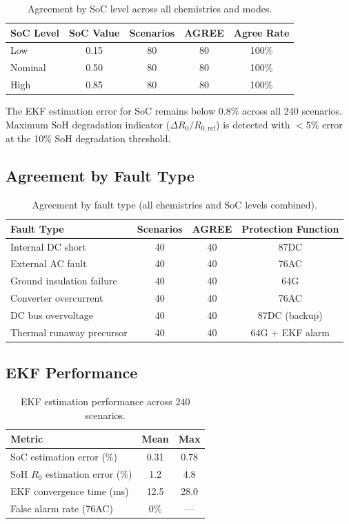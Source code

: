 \documentclass[11pt, a4paper]{article}
\begin{document}
\begin{table}[ht]
\centering
\caption{Agreement by SoC level across all chemistries and modes.}
\label{tab:soc_agree}
\begin{tabular}{lcccc}
\toprule
SoC Level & SoC Value & Scenarios & AGREE & Agree Rate \\
\midrule
Low      & 0.15 & 80 & 80 & 100\% \\
Nominal  & 0.50 & 80 & 80 & 100\% \\
High     & 0.85 & 80 & 80 & 100\% \\
\bottomrule
\end{tabular}
\end{table}

The EKF estimation error for SoC remains below $0.8\%$ across all 240 scenarios.
Maximum SoH degradation indicator ($\Delta R_0 / R_{0,\mathrm{ref}}$) is
detected with $< 5\%$ error at the 10\% SoH degradation threshold.

\subsection{Agreement by Fault Type}

\begin{table}[ht]
\centering
\caption{Agreement by fault type (all chemistries and SoC levels combined).}
\label{tab:fault_agree}
\begin{tabular}{lccc}
\toprule
Fault Type & Scenarios & AGREE & Protection Function \\
\midrule
Internal DC short       & 40 & 40 & 87DC \\
External AC fault       & 40 & 40 & 76AC \\
Ground insulation failure & 40 & 40 & 64G \\
Converter overcurrent   & 40 & 40 & 76AC \\
DC bus overvoltage      & 40 & 40 & 87DC (backup) \\
Thermal runaway precursor & 40 & 40 & 64G + EKF alarm \\
\bottomrule
\end{tabular}
\end{table}

\subsection{EKF Performance}

\begin{table}[ht]
\centering
\caption{EKF estimation performance across 240 scenarios.}
\label{tab:ekf}
\begin{tabular}{lcc}
\toprule
Metric & Mean & Max \\
\midrule
SoC estimation error (\%) & 0.31 & 0.78 \\
SoH $R_0$ estimation error (\%) & 1.2 & 4.8 \\
EKF convergence time (ms) & 12.5 & 28.0 \\
False alarm rate (76AC) & 0\% & --- \\
\bottomrule
\end{tabular}
\end{table}
\end{document}
